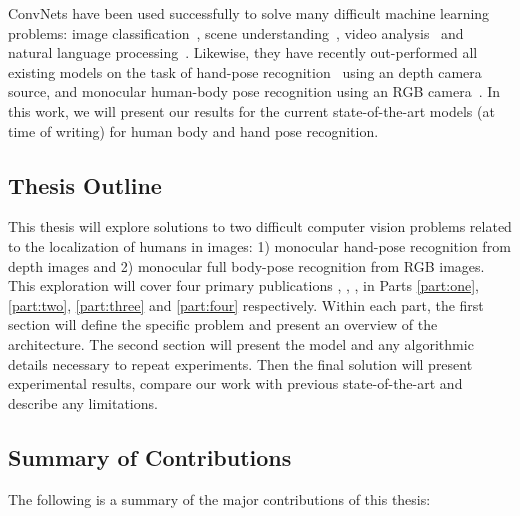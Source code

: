 ConvNets have been used successfully to solve many difficult machine learning problems: image classification~\cite{pedestrianCVPR13, overfeatSermanet, ImageNet_NIPS2012_0534, googlenet}, scene understanding~\cite{Farabet}, video analysis~\cite{KarpathyCVPR14} and natural language processing~\cite{ilya_sequence,cho_emnlp_2014}. Likewise, they have recently out-performed all existing models on the task of hand-pose recognition~\cite{tompsonTOG14} using an depth camera source, and monocular human-body pose recognition using an RGB camera~\cite{tompsonnips2014, arjunaccv2014, jainiclr2014, deeppose, chennips2014, tompson_efficient}. In this work, we will present our results for the current state-of-the-art models (at time of writing) for human body and hand pose recognition.

\subsection*{Thesis Outline}

This thesis will explore solutions to two difficult computer vision problems related to the localization of humans in images: 1) monocular hand-pose recognition from depth images and 2) monocular full body-pose recognition from RGB images. This exploration will cover four primary publications \cite{tompsonTOG14}, \cite{tompsonnips2014}, \cite{arjunaccv2014}, \cite{tompson_efficient} in Parts \ref{part:one}, \ref{part:two}, \ref{part:three} and \ref{part:four} respectively. Within each part, the first section will define the specific problem and present an overview of the architecture. The second section will present the model and any algorithmic details necessary to repeat experiments. Then the final solution will present experimental results, compare our work with previous state-of-the-art and describe any limitations.

\subsection*{Summary of Contributions}

The following is a summary of the major contributions of this thesis:


